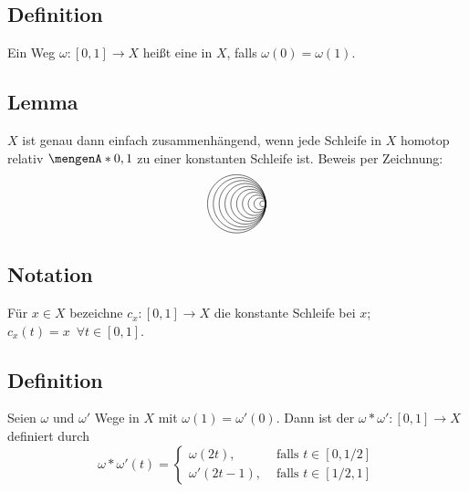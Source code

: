 \subsection[Definition: Schleife]{Definition} %
\label{sub:94}
Ein Weg $\omega : [0,1] \to X$ heißt eine  in $X$, falls $\omega(0)= \omega(1)$. 

\subsection{Lemma} %
\label{sub:95}
$X$ ist genau dann einfach zusammenhängend, wenn jede Schleife in $X$ homotop relativ $\set{0,1}$ zu einer konstanten Schleife ist.
Beweis per Zeichnung:
\[
	\begin{tikzpicture}[scale=0.8]
		\foreach \r in {0.1, 0.2,...,1}{
			\draw (0,0) arc (0:360:\r); 
		}
	\end{tikzpicture}
\]

\subsection[Notation: Konstante Schleife]{Notation} %
\label{sub:96}
Für $x \in X$ bezeichne $c_x : [0,1] \to X$ die konstante Schleife bei $x$; $c_x(t)= x \enspace \forall t \in [0,1]$.

\subsection[Definition: Kompositionsweg]{Definition} %
\label{sub:97}
Seien $\omega$ und $\omega'$ Wege in $X$ mit $\omega(1)= \omega'(0)$. Dann ist der  $\omega * \omega' : [0,1] \to X$ definiert durch 
\[
	\omega * \omega' (t) = \begin{cases}
		\omega(2 t), &\text{ falls }t \in [0, 1/2]\\
		\omega'(2t -1), &\text{ falls } t \in [1/2,1]
	\end{cases}
\] 
